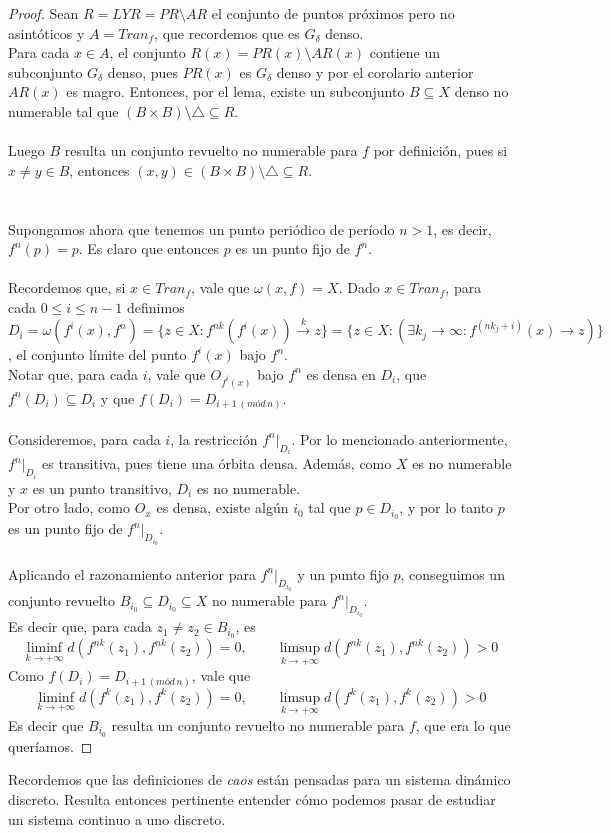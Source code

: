 \documentclass[12pt,a4paper]{article}
\begin{document}
\begin{proof}
Sean $R = LYR = PR \setminus AR$ el conjunto de puntos próximos pero no asintóticos y $A = \textit{Tran}_f$, que recordemos que es $G_{\delta}$ denso.
\\
Para cada $x \in A$, el conjunto $R(x) = PR(x) \setminus AR(x)$ contiene un subconjunto $G_\delta$ denso, pues $PR(x)$ es $G_\delta$ denso y por el corolario anterior $AR(x)$ es magro. Entonces, por el lema, existe un subconjunto $B \subseteq X$ denso no numerable tal que $(B \times B) \setminus \triangle \subseteq R$.
\\
\\
Luego $B$ resulta un conjunto revuelto no numerable para $f$ por definición, pues si $x \neq y \in B$, entonces $(x,y) \in (B \times B) \setminus \triangle \subseteq R$.
\\
\\
\\
Supongamos ahora que tenemos un punto periódico de período $n>1$, es decir, $f^n(p) = p$. Es claro que entonces $p$ es un punto fijo de $f^n$.
\\
\\
Recordemos que, si $x \in \textit{Tran}_f$, vale que $\omega(x,f) = X$. Dado $x \in \textit{Tran}_f$, para cada $0 \leq i \leq n-1$ definimos $D_i = \omega(f^i(x), f^n) = \{z \in X : f^{nk}(f^i(x)) \xrightarrow{k} z\} = \{z \in X : (\exists k_j \rightarrow \infty : f^{(nk_j + i)}(x) \rightarrow z) \}$, el conjunto límite del punto $f
^i(x)$ bajo $f^n$.
\\
Notar que, para cada $i$, vale que $O_{f^i(x)}$ bajo $f^n$ es densa en $D_i$, que $f^n(D_i) \subseteq D_i$ y que $f(D_i) = D_{i+1 \, (mód \, n)}$.
\\
\\
Consideremos, para cada $i$, la restricción $f^n|_{D_i}$. Por lo mencionado anteriormente, $f^n|_{D_i}$ es transitiva, pues tiene una órbita densa. Además, como $X$ es no numerable y $x$ es un punto transitivo, $D_i$ es no numerable.
\\
Por otro lado, como $O_x$ es densa, existe algún $i_0$ tal que $p \in D_{i_0}$, y por lo tanto $p$ es un punto fijo de $f^n|_{D_{i_0}}$.
\\
\\
Aplicando el razonamiento anterior para $f^n|_{D_{i_0}}$ y un punto fijo $p$, conseguimos un conjunto revuelto $B_{i_0} \subseteq D_{i_0} \subseteq X$ no numerable para $f^n|_{D_{i_0}}$.
\\
Es decir que, para cada $z_1 \neq z_2 \in B_{i_0}$, es 
\[
\displaystyle \liminf_{k \rightarrow +\infty} d(f^{nk}(z_1), f^{nk}(z_2)) = 0, \qquad \displaystyle \limsup_{k \rightarrow +\infty} d(f^{nk}(z_1), f^{nk}(z_2)) > 0
\]
Como $f(D_i) = D_{i+1 \, (mód \, n)}$, vale que
\[
\displaystyle \liminf_{k \rightarrow +\infty} d(f^k(z_1), f^k(z_2)) = 0, \qquad \displaystyle \limsup_{k \rightarrow +\infty} d(f^k(z_1), f^k(z_2)) > 0
\]
Es decir que $B_{i_0}$ resulta un conjunto revuelto no numerable para $f$, que era lo que queríamos.
\end{proof}
Recordemos que las definiciones de \textit{caos} están pensadas para un sistema dinámico discreto. Resulta entonces pertinente entender cómo podemos pasar de estudiar un sistema continuo a uno discreto.
\end{document}
